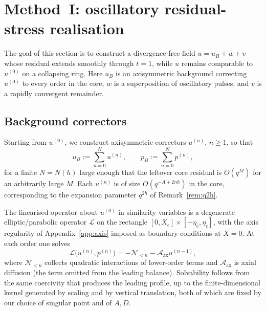 \section{Method~I: oscillatory residual-stress realisation}
\label{sec:methodI}

The goal of this section is to construct a divergence-free field $u=u_B+w+v$ whose residual extends smoothly through $t=1$, while $u$ remains comparable to $u^{(0)}$ on a collapsing ring. Here $u_B$ is an axisymmetric background correcting $u^{(0)}$ to every order in the core, $w$ is a superposition of oscillatory pulses, and $v$ is a rapidly convergent remainder.

\subsection{Background correctors}
\label{sec:background}

\begin{construction}
\label{con:background}
Starting from $u^{(0)}$, we construct axisymmetric correctors $u^{(n)}$, $n\ge 1$, so that
\[
u_B:=\sum_{n=0}^N u^{(n)},
\qquad
p_B:=\sum_{n=0}^N p^{(n)},
\]
for a finite $N=N(h)$ large enough that the leftover core residual is $O(q^{M})$ for an arbitrarily large $M$. Each $u^{(n)}$ is of size $O(q^{-A+2nh})$ in the core, corresponding to the expansion parameter $q^{2h}$ of Remark~\ref{rem:q2h}.
\end{construction}

The linearised operator about $u^{(0)}$ in similarity variables is a degenerate elliptic/parabolic operator $\mathcal L$ on the rectangle $[0,X_c]\times[-\eta_c,\eta_c]$, with the axis regularity of Appendix~\ref{app:axis} imposed as boundary conditions at $X=0$. At each order one solves
\[
\mathcal L\bigl(u^{(n)},p^{(n)}\bigr)
= -\mathcal N_{<n}-\mathcal A_{\mathrm{ax}}u^{(n-1)},
\]
where $\mathcal N_{<n}$ collects quadratic interactions of lower-order terms and $\mathcal A_{\mathrm{ax}}$ is axial diffusion (the term omitted from the leading balance). Solvability follows from the same coercivity that produces the leading profile, up to the finite-dimensional kernel generated by scaling and by vertical translation, both of which are fixed by our choice of singular point and of $A,D$.

